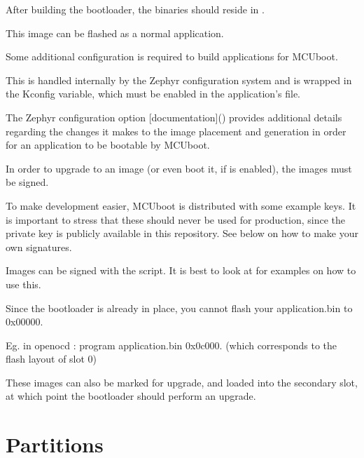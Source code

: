 \documentclass[letterpaper,10pt,english]{sphinxmanual}
\begin{document}
After building the bootloader, the binaries should reside in
.

This image can be flashed as a normal application.

Some additional configuration is required to build applications for MCUboot.

This is handled internally by the Zephyr configuration system and is wrapped
in the  Kconfig variable, which must be enabled in
the application’s  file.

The Zephyr  configuration option
{[}documentation{]}()
provides additional details regarding the changes it makes to the image
placement and generation in order for an application to be bootable by
MCUboot.

In order to upgrade to an image (or even boot it, if
 is enabled), the images must be signed.

To make development easier, MCUboot is distributed with some example
keys.  It is important to stress that these should never be used for
production, since the private key is publicly available in this
repository.  See below on how to make your own signatures.

Images can be signed with the  script.  It is best
to look at  for examples on how to use this.

Since the bootloader is already in place, you cannot flash your application.bin to 0x00000.

Eg. in openocd : program application.bin 0x0c000. (which corresponds to the flash layout of slot 0)

These images can also be marked for upgrade, and loaded into the secondary slot,
at which point the bootloader should perform an upgrade.


\section{Partitions}
\label{\detokenize{fota/partitions:partitions}}\label{\detokenize{fota/partitions:signing}}\label{\detokenize{fota/partitions::doc}}
\begin{sphinxVerbatim}[commandchars=\\\{\}]
\end{sphinxVerbatim}
\end{document}
